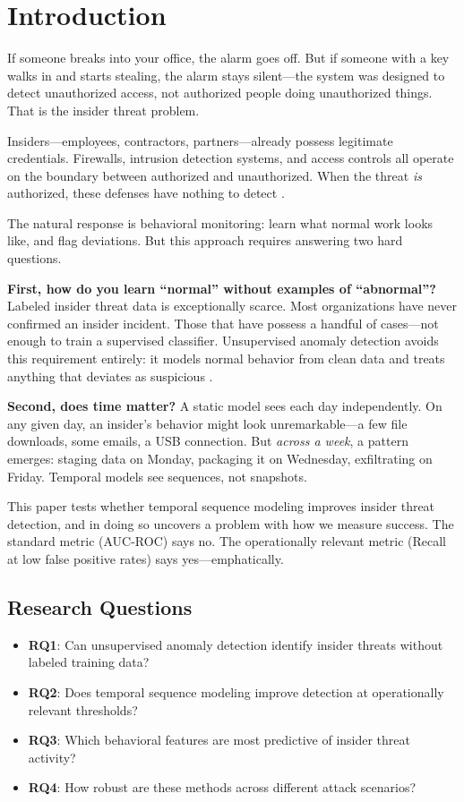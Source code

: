 \documentclass[conference]{IEEEtran}
\newcommand{\RQ}[1]{\textbf{RQ#1}}
\begin{document}
\section{Introduction}
\label{sec:introduction}

If someone breaks into your office, the alarm goes off. But if someone with a key walks in and starts stealing, the alarm stays silent---the system was designed to detect unauthorized access, not authorized people doing unauthorized things. That is the insider threat problem.

Insiders---employees, contractors, partners---already possess legitimate credentials. Firewalls, intrusion detection systems, and access controls all operate on the boundary between authorized and unauthorized. When the threat \textit{is} authorized, these defenses have nothing to detect \cite{cappelli2012cert}.

The natural response is behavioral monitoring: learn what normal work looks like, and flag deviations. But this approach requires answering two hard questions.

\textbf{First, how do you learn ``normal'' without examples of ``abnormal''?} Labeled insider threat data is exceptionally scarce. Most organizations have never confirmed an insider incident. Those that have possess a handful of cases---not enough to train a supervised classifier. Unsupervised anomaly detection avoids this requirement entirely: it models normal behavior from clean data and treats anything that deviates as suspicious \cite{chalapathy2019deep}.

\textbf{Second, does time matter?} A static model sees each day independently. On any given day, an insider's behavior might look unremarkable---a few file downloads, some emails, a USB connection. But \textit{across a week}, a pattern emerges: staging data on Monday, packaging it on Wednesday, exfiltrating on Friday. Temporal models see sequences, not snapshots.

This paper tests whether temporal sequence modeling improves insider threat detection, and in doing so uncovers a problem with how we measure success. The standard metric (AUC-ROC) says no. The operationally relevant metric (Recall at low false positive rates) says yes---emphatically.

\subsection{Research Questions}

\begin{itemize}
    \item \RQ{1}: Can unsupervised anomaly detection identify insider threats without labeled training data?
    \item \RQ{2}: Does temporal sequence modeling improve detection at operationally relevant thresholds?
    \item \RQ{3}: Which behavioral features are most predictive of insider threat activity?
    \item \RQ{4}: How robust are these methods across different attack scenarios?
\end{itemize}
\end{document}

